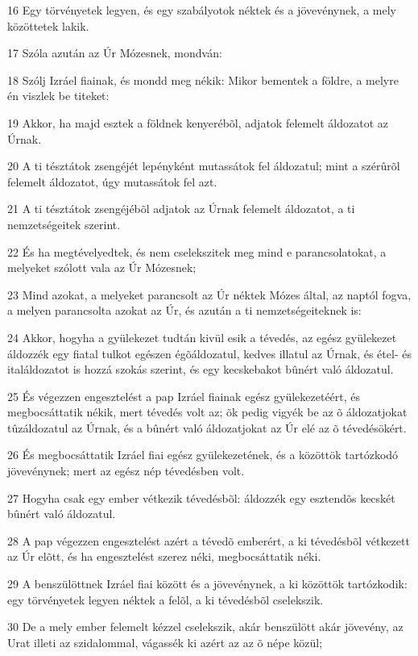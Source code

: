 \par 16 Egy törvényetek legyen, és egy szabályotok néktek és a jövevénynek, a mely közöttetek lakik.
\par 17 Szóla azután az Úr Mózesnek, mondván:
\par 18 Szólj Izráel fiainak, és mondd meg nékik: Mikor bementek a földre, a melyre én viszlek be titeket:
\par 19 Akkor, ha majd esztek a földnek kenyerébõl, adjatok felemelt áldozatot az Úrnak.
\par 20 A ti tésztátok zsengéjét lepényként mutassátok fel áldozatul; mint a szérûrõl felemelt áldozatot, úgy mutassátok fel azt.
\par 21 A ti tésztátok zsengéjébõl adjatok az Úrnak felemelt áldozatot, a ti nemzetségeitek szerint.
\par 22 És ha megtévelyedtek, és nem cselekszitek meg mind e parancsolatokat, a melyeket szólott vala az Úr Mózesnek;
\par 23 Mind azokat, a melyeket parancsolt az Úr néktek Mózes által, az naptól fogva, a melyen parancsolta azokat az Úr, és azután a ti nemzetségeiteknek is:
\par 24 Akkor, hogyha a gyülekezet tudtán kivül esik a tévedés, az egész gyülekezet áldozzék egy fiatal tulkot egészen égõáldozatul, kedves illatul az Úrnak, és étel- és italáldozatot is hozzá szokás szerint, és egy kecskebakot bûnért való áldozatul.
\par 25 És végezzen engesztelést a pap Izráel fiainak egész gyülekezetéért, és megbocsáttatik nékik, mert tévedés volt az; õk pedig vigyék be az õ áldozatjokat tûzáldozatul az Úrnak, és a bûnért való áldozatjokat az Úr elé az õ tévedésökért.
\par 26 És megbocsáttatik Izráel fiai egész gyülekezetének, és a közöttök tartózkodó jövevénynek; mert az egész nép tévedésben volt.
\par 27 Hogyha csak egy ember vétkezik tévedésbõl: áldozzék egy esztendõs kecskét bûnért való áldozatul.
\par 28 A pap végezzen engesztelést azért a tévedõ emberért, a ki tévedésbõl vétkezett az Úr elõtt, és ha engesztelést szerez néki, megbocsáttatik néki.
\par 29 A benszülöttnek Izráel fiai között és a jövevénynek, a ki közöttök tartózkodik: egy törvényetek legyen néktek a felõl, a ki tévedésbõl cselekszik.
\par 30 De a mely ember felemelt kézzel cselekszik, akár benszülött akár jövevény, az Urat illeti az szidalommal, vágassék ki azért az az õ népe közül;
